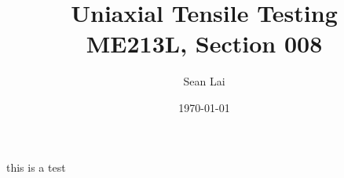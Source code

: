 \documentclass{article}
\title{Uniaxial Tensile Testing \\ ME213L, Section 008}
\author{Sean Lai} %
\date{\today} %
\begin{document}
this is a test
\end{document}
